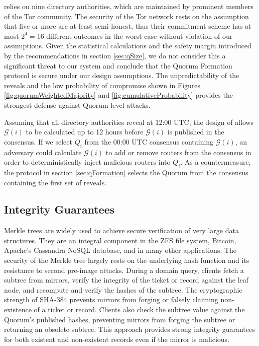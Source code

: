 \documentclass[USenglish,oneside,twocolumn]{article}
\begin{document}
\cite{GouletCommitReveal} relies on nine directory authorities, which are maintained by prominent members of the Tor community. The security of the Tor network rests on the assumption that five or more are at least semi-honest, thus their commitment scheme has at most $ 2^{4} = 16 $ different outcomes in the worst case without violation of our assumptions. Given the statistical calculations and the safety margin introduced by the recommendations in section \ref{sec:qSize}, we do not consider this a significant threat to our system and conclude that the Quorum Formation protocol is secure under our design assumptions. The unpredictability of the reveals and the low probability of compromise shown in Figures \ref{fig:quorumWeightedMajority} and \ref{fig:cumulativeProbability} provides the strongest defense against Quorum-level attacks.


Assuming that all directory authorities reveal at 12:00 UTC, the design of \cite{GouletCommitReveal} allows $ \mathcal{G}(i) $ to be calculated up to 12 hours before $ \mathcal{G}(i) $ is published in the consensus. If we select $ Q_{i} $ from the 00:00 UTC consensus containing $ \mathcal{G}(i) $, an adversary could calculate $ \mathcal{G}(i) $ to add or remove routers from the consensus in order to deterministically inject malicious routers into $ Q_{i} $. As a countermeasure, the protocol in section \ref{sec:qFormation} selects the Quorum from the consensus containing the first set of reveals.

\subsection{Integrity Guarantees}

Merkle trees are widely used to achieve secure verification of very large data structures. They are an integral component in the ZFS file system, Bitcoin, \cite{nakamoto2008bitcoin} Apache's Cassandra NoSQL database, \cite{CassandraDatabase} and in many other applications. The security of the Merkle tree largely rests on the underlying hash function and its resistance to second pre-image attacks. During a domain query, clients fetch a subtree from mirrors, verify the integrity of the ticket or record against the leaf node, and recompute and verify the hashes of the subtree. The cryptographic strength of SHA-384 prevents mirrors from forging or falsely claiming non-existence of a ticket or record. Clients also check the subtree value against the Quorum's published hashes, preventing mirrors from forging the subtree or returning an obsolete subtree. This approach provides strong integrity guarantees for both existent and non-existent records even if the mirror is malicious.
\end{document}
